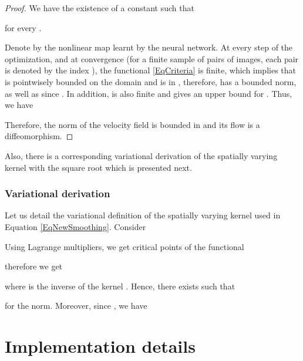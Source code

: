 \documentclass[10pt,twocolumn,letterpaper,table]{article}
\numberwithin{equation}{section}
\theoremstyle{plain}
\theoremstyle{definition}
\begin{document}
\begin{proof}
We have the existence of a constant  such that 

for every .
\par
Denote by  the nonlinear map learnt by the neural network.
At every step of the optimization, and at convergence (for a finite sample of pairs of images, each pair is denoted by the index ), the functional \eqref{EqCriteria} is finite, which implies that  is pointwisely bounded on the domain and is in , therefore,  has a bounded  norm, as well as  since . In addition,  is also finite and gives an upper bound for . Thus, we have

Therefore, the norm of the velocity field  is bounded in  and its flow is a diffeomorphism.
\end{proof}
Also, there is a corresponding variational derivation of the spatially varying kernel with the square root which is presented next.

\subsubsection{Variational derivation}
Let us detail the variational definition of the spatially varying kernel used in Equation \eqref{EqNewSmoothing}. 
Consider 

Using Lagrange multipliers, we get critical points of the functional 

therefore we get

where  is the inverse of the kernel .
Hence, there exists  such that 
 
for the norm. Moreover, since , we have


\section{Implementation details}
\label{sec:implementation_details}
\end{document}

